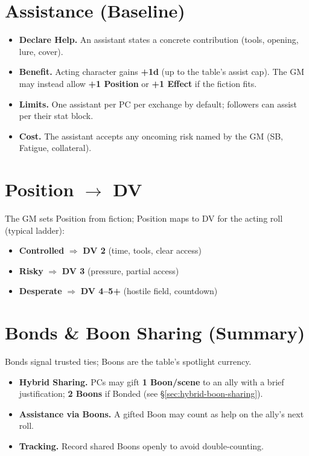 \section{Assistance (Baseline)}
\label{sec:assistance}
\begin{itemize}
  \item \textbf{Declare Help.} An assistant states a concrete contribution (tools, opening, lure, cover).
  \item \textbf{Benefit.} Acting character gains \textbf{+1d} (up to the table’s assist cap). The GM may instead allow \textbf{+1 Position} or \textbf{+1 Effect} if the fiction fits.
  \item \textbf{Limits.} One assistant per PC per exchange by default; followers can assist per their stat block.
  \item \textbf{Cost.} The assistant accepts any oncoming risk named by the GM (SB, Fatigue, collateral).
\end{itemize}

\section{Position $\to$ DV}
\label{sec:position-to-dv}
\noindent The GM sets Position from fiction; Position maps to DV for the acting roll (typical ladder):
\begin{itemize}
  \item \textbf{Controlled} $\Rightarrow$ \textbf{DV 2} \quad (time, tools, clear access)
  \item \textbf{Risky} $\Rightarrow$ \textbf{DV 3} \quad (pressure, partial access)
  \item \textbf{Desperate} $\Rightarrow$ \textbf{DV 4--5+} \quad (hostile field, countdown)
\end{itemize}

\section{Bonds \& Boon Sharing (Summary)}
\label{sec:bonds-boons-summary}
\noindent Bonds signal trusted ties; Boons are the table’s spotlight currency.
\begin{itemize}
  \item \textbf{Hybrid Sharing.} PCs may gift \textbf{1 Boon/scene} to an ally with a brief justification; \textbf{2 Boons} if Bonded (see \S\ref{sec:hybrid-boon-sharing}).
  \item \textbf{Assistance via Boons.} A gifted Boon may count as help on the ally’s next roll.
  \item \textbf{Tracking.} Record shared Boons openly to avoid double-counting.
\end{itemize}

